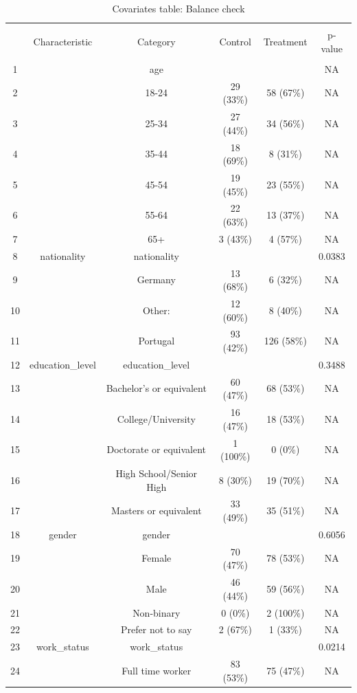\documentclass[
]{article}
\begin{document}
\begin{table}[!htbp] \centering 
  \caption{Covariates table: Balance check} 
  \label{} 
\begin{tabular}{@{\extracolsep{5pt}} cccccc} 
\\[-1.8ex]\hline 
\hline \\[-1.8ex] 
 & Characteristic & Category & Control & Treatment & p-value \\ 
\hline \\[-1.8ex] 
1 &  & age &  &  & NA \\ 
2 &  & 18-24 & 29 (33\%) & 58 (67\%) & NA \\ 
3 &  & 25-34 & 27 (44\%) & 34 (56\%) & NA \\ 
4 &  & 35-44 & 18 (69\%) & 8 (31\%) & NA \\ 
5 &  & 45-54 & 19 (45\%) & 23 (55\%) & NA \\ 
6 &  & 55-64 & 22 (63\%) & 13 (37\%) & NA \\ 
7 &  & 65+ & 3 (43\%) & 4 (57\%) & NA \\ 
8 & nationality & nationality &  &  & 0.0383 \\ 
9 &  & Germany & 13 (68\%) & 6 (32\%) & NA \\ 
10 &  & Other: & 12 (60\%) & 8 (40\%) & NA \\ 
11 &  & Portugal & 93 (42\%) & 126 (58\%) & NA \\ 
12 & education\_level & education\_level &  &  & 0.3488 \\ 
13 &  & Bachelor's or equivalent & 60 (47\%) & 68 (53\%) & NA \\ 
14 &  & College/University & 16 (47\%) & 18 (53\%) & NA \\ 
15 &  & Doctorate or equivalent & 1 (100\%) & 0 (0\%) & NA \\ 
16 &  & High School/Senior High & 8 (30\%) & 19 (70\%) & NA \\ 
17 &  & Masters or equivalent & 33 (49\%) & 35 (51\%) & NA \\ 
18 & gender & gender &  &  & 0.6056 \\ 
19 &  & Female & 70 (47\%) & 78 (53\%) & NA \\ 
20 &  & Male & 46 (44\%) & 59 (56\%) & NA \\ 
21 &  & Non-binary & 0 (0\%) & 2 (100\%) & NA \\ 
22 &  & Prefer not to say & 2 (67\%) & 1 (33\%) & NA \\ 
23 & work\_status & work\_status &  &  & 0.0214 \\ 
24 &  & Full time worker & 83 (53\%) & 75 (47\%) & NA \\ 

\end{tabular}
\end{table}
\end{document}

